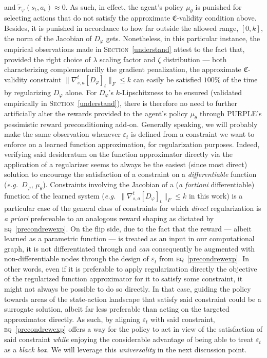 and $\tilde{r}_\varphi (s_t,a_t) \approx 0$.
As such, in effect, the agent's policy $\mu_\theta$ is punished for selecting actions that do not satisfy the
approximate $\mathfrak{C}$-validity condition above.
Besides, it is punished in accordance to how far outside the allowed
range, $[0,k]$, the norm of the Jacobian of $D_\varphi$ gets.
Nonetheless, in this particular instance, the empirical observations made in \textsc{Section}~\ref{understand}
attest to the fact that, provided the right choice of $\lambda$ scaling factor and $\zeta$ distribution
--- both characterizing complementarilly the gradient penalization,
the approximate $\mathfrak{C}$-validity constraint $\lVert \nabla_{s,a}^t[D_\varphi]_t \rVert _F \leq k$
can easily be satisfied $100\%$ of the time by regularizing $D_\varphi$ alone.
For $D_\varphi$'s $k$-Lipschitzness to be ensured (validated empirically in \textsc{Section}~\ref{understand}),
there is therefore no need to further artificially alter the rewards provided to the agent's policy $\mu_\theta$
through PURPLE's pessimistic reward preconditioning add-on.
Generally speaking, we will probably make the same observation whenever $\varepsilon_t$ is defined from a constraint
we want to enforce on a learned function approximation, for regularization purposes.
Indeed, verifying said desideratum on the function approximator directly via the application of a regularizer seems
to always be the easiest (since most direct) solution to encourage the satisfaction of a constraint on
a \emph{differentiable} function (\textit{e.g.}~$D_\varphi$, $\mu_\theta$).
Constraints involving the Jacobian of a (\textit{a fortioni} differentiable) function of the learned system
(\textit{e.g.}~$\lVert \nabla_{s,a}^t[D_\varphi]_t \rVert _F \leq k$ in this work)
is a particular case of the general class of constraints for which \emph{direct} regularization is
\textit{a priori} prefereable to an analogous reward shaping as dictated by \textsc{eq}~\ref{precondrewexp}.
On the flip side, due to the fact that the reward --- albeit learned as a parametric function ---
is treated as an input in our computational graph,
it is not differentiated through and \emph{can} consequently
be augmented with non-differentiable nodes through the design of $\varepsilon_t$ from \textsc{eq}~\ref{precondrewexp}.
In other words, even if it is preferable to apply regularization directly the objective of the regularized
function approximator for it to satisfy some constraint,
it might not always be possible to do so directly.
In that case, guiding the policy towards areas of the state-action landscape that satisfy said constraint
could be a surrogate solution, albeit far less preferable than acting on the targeted approximator directly.
As such, by aligning $\varepsilon_t$ with said constraint, \textsc{eq}~\ref{precondrewexp} offers a way for the policy
to act in view of the satisfaction of said constraint \emph{while} enjoying the considerable advantage
of being able to treat $\varepsilon_t$ as a \emph{black box}.
We will leverage this \emph{universality} in the next discussion point.

